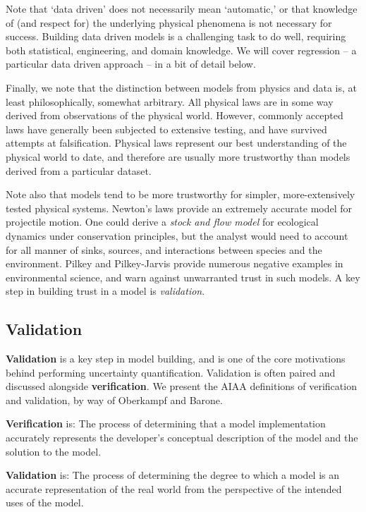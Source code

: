 \documentclass[../primer.tex]{subfiles}
\begin{document}
Note that `data driven' does not necessarily mean `automatic,' or that knowledge
of (and respect for) the underlying physical phenomena is not necessary for
success. Building data driven models is a challenging task to do well, requiring
both statistical, engineering, and domain knowledge. We will cover regression --
a particular data driven approach -- in a bit of detail below.

Finally, we note that the distinction between models from physics and data is,
at least philosophically, somewhat arbitrary. All physical laws are in some way
derived from observations of the physical world. However, commonly accepted laws
have generally been subjected to extensive testing, and have survived attempts
at falsification.\cite{popper2005logic} Physical laws represent our best
understanding of the physical world to date, and therefore are usually more
trustworthy than models derived from a particular dataset.

Note also that models tend to be more trustworthy for simpler, more-extensively
tested physical systems. Newton's laws provide an extremely accurate model for
projectile motion. One could derive a \emph{stock and flow model} for ecological
dynamics under conservation principles, but the analyst would need to account
for all manner of sinks, sources, and interactions between species and the
environment. Pilkey and Pilkey-Jarvis\cite{pilkey2007useless} provide numerous
negative examples in environmental science, and warn against unwarranted trust
in such models. A key step in building trust in a model is \emph{validation}.

\subsection{Validation}
\textbf{Validation} is a key step in model building, and is one of the core
motivations behind performing uncertainty quantification. Validation is often
paired and discussed alongside \textbf{verification}. We present the AIAA
definitions of verification and validation, by way of Oberkampf and
Barone.\cite{oberkampf2006measures}

\textbf{Verification} is: The process of determining that a model implementation
accurately represents the developer's conceptual description of the model and
the solution to the model.

\textbf{Validation} is: The process of determining the degree to which a model
is an accurate representation of the real world from the perspective of the
intended uses of the model.
\end{document}
